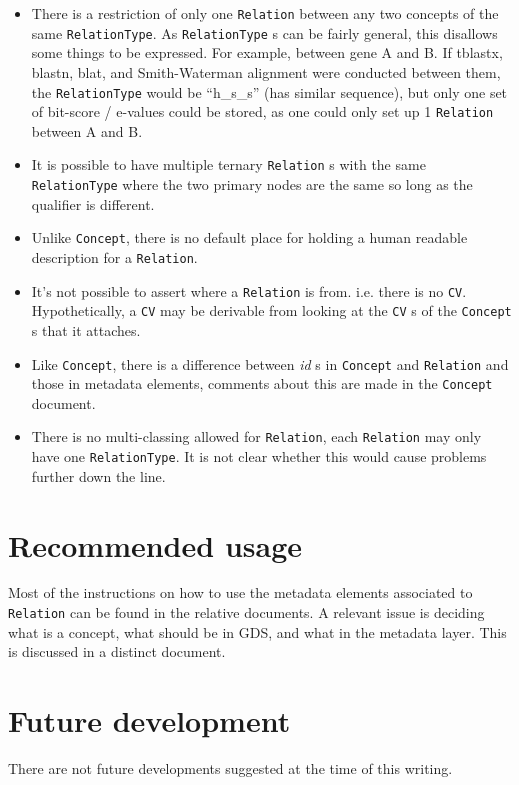\documentclass[a4paper,10pt]{article}
\newcommand{\field}[1]{\textit{#1}\xspace}
\newcommand{\term}[1]{\texttt{#1}\xspace}
\newcommand{\co}{\term{Concept}}
\newcommand{\rt}{\term{RelationType}}
\newcommand{\re}{\term{Relation}}
\begin{document}
\begin{itemize}

\item There is a restriction of only one \re between any two concepts of the same \rt. As \rt s can be fairly general, this disallows some things to be expressed. For example, between gene A and B. If tblastx, blastn, blat, and Smith-Waterman alignment were conducted between them, the \rt would be ``h\_s\_s'' (has similar sequence), but only one set of bit-score / e-values could be stored, as one could only set up 1 \re between A and B.

\item It is possible to have multiple ternary \re s with the same \rt where the two primary nodes are the same so long as the qualifier is different.

\item Unlike \co , there is no default place for holding a human readable description for a \re.

\item It's not possible to assert where a \re is from. i.e. there is no \term{CV}. Hypothetically, a \term{CV} may be derivable from looking at the \term{CV}s of the \co s that it attaches.

\item Like \co , there is a difference between \field{id}s in \co and \re and those in metadata elements, comments about this are made in the \co document.

\item There is no multi-classing allowed for \re , each \re may only have one \rt . It is not clear whether this would cause problems further down the line.

\end{itemize}


\section{Recommended usage}
Most of the instructions on how to use the metadata elements associated to \re can be found in the relative documents. A relevant issue is deciding what is a concept, what should be in GDS, and what in the metadata layer. This is discussed in a distinct document.

\section{Future development}
There are not future developments suggested at the time of this writing.
\end{document}
